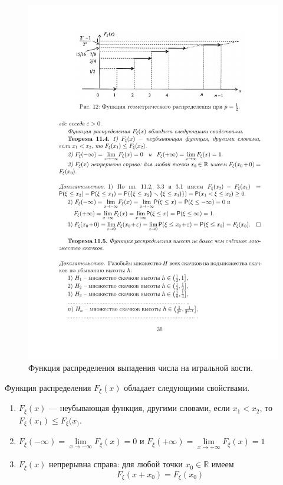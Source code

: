 \begin{figure}[H]
	\centering
	\includegraphics[]{pic/pic12}
	\caption{Функция распределения выпадения числа на игральной кости.}
	\label{fig12}
\end{figure}


Функция распределения $F_{\xi}(x)$ обладает следующими свойствами.

\begin{theorem}
\label{th:11.4}
\vspace{1em}

	\begin{enumerate}

		\item $F_{\xi}(x)$ — неубывающая функция, другими словами,
			если $x_1 < x_2$, то $F_{\xi}(x_1) \leqslant F_{\xi}(x_)$.
		\item $F_{\xi}(-\infty)=\lim\limits_{x\to-\infty}F_{\xi}(x)=0$ и 
			$F_{\xi}(+\infty)=\lim\limits_{x\to+\infty}F_{\xi}(x)=1$
		\item $F_{\xi}(x)$ непрерывна справа: для любой точки $x_0 \in \mathbb{R}$ имеем $$F_{\xi}(x+x_0) =F_{\xi}(x_0)$$
	\end{enumerate}
\end{theorem}


